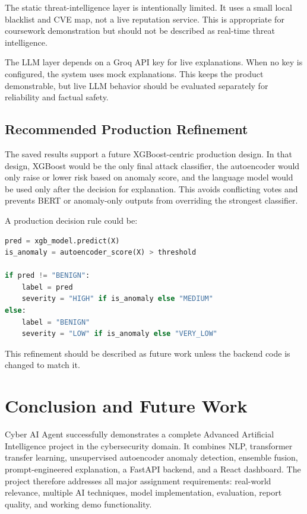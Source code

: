 \documentclass[12pt,a4paper]{article}
\begin{document}
The static threat-intelligence layer is intentionally limited. It uses a small local blacklist and CVE map, not a live reputation service. This is appropriate for coursework demonstration but should not be described as real-time threat intelligence.

The LLM layer depends on a Groq API key for live explanations. When no key is configured, the system uses mock explanations. This keeps the product demonstrable, but live LLM behavior should be evaluated separately for reliability and factual safety.

\subsection{Recommended Production Refinement}

The saved results support a future XGBoost-centric production design. In that design, XGBoost would be the only final attack classifier, the autoencoder would only raise or lower risk based on anomaly score, and the language model would be used only after the decision for explanation. This avoids conflicting votes and prevents BERT or anomaly-only outputs from overriding the strongest classifier.

A production decision rule could be:

\begin{lstlisting}[language=Python, caption={Recommended future production decision rule}]
pred = xgb_model.predict(X)
is_anomaly = autoencoder_score(X) > threshold

if pred != "BENIGN":
    label = pred
    severity = "HIGH" if is_anomaly else "MEDIUM"
else:
    label = "BENIGN"
    severity = "LOW" if is_anomaly else "VERY_LOW"
\end{lstlisting}

This refinement should be described as future work unless the backend code is changed to match it.

\section{Conclusion and Future Work}

Cyber AI Agent successfully demonstrates a complete Advanced Artificial Intelligence project in the cybersecurity domain. It combines NLP, transformer transfer learning, unsupervised autoencoder anomaly detection, ensemble fusion, prompt-engineered explanation, a FastAPI backend, and a React dashboard. The project therefore addresses all major assignment requirements: real-world relevance, multiple AI techniques, model implementation, evaluation, report quality, and working demo functionality.
\end{document}
